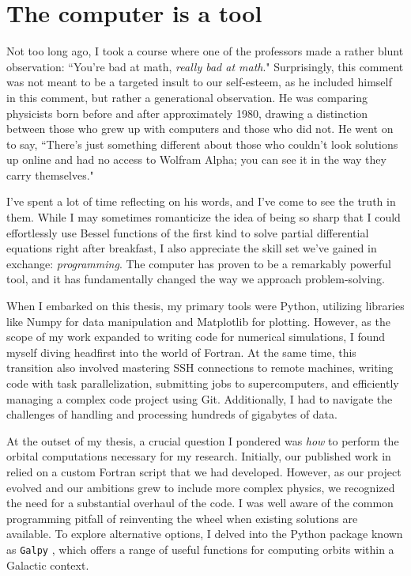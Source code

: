 \section{The computer is a tool} \label{sec:Computer}

Not too long ago, I took a course where one of the professors made a rather blunt observation: ``You're bad at math, \textit{really bad at math}." Surprisingly, this comment was not meant to be a targeted insult to our self-esteem, as he included himself in this comment, but rather a generational observation. He was comparing physicists born before and after approximately 1980, drawing a distinction between those who grew up with computers and those who did not. He went on to say, ``There's just something different about those who couldn't look solutions up online and had no access to Wolfram Alpha; you can see it in the way they carry themselves."

I've spent a lot of time reflecting on his words, and I've come to see the truth in them. While I may sometimes romanticize the idea of being so sharp that I could effortlessly use Bessel functions of the first kind to solve partial differential equations right after breakfast, I also appreciate the skill set we've gained in exchange: \textit{programming}. The computer has proven to be a remarkably powerful tool, and it has fundamentally changed the way we approach problem-solving.

When I embarked on this thesis, my primary tools were Python, utilizing libraries like Numpy for data manipulation and Matplotlib for plotting. However, as the scope of my work expanded to writing code for numerical simulations, I found myself diving headfirst into the world of Fortran. At the same time, this transition also involved mastering SSH connections to remote machines, writing code with task parallelization, submitting jobs to supercomputers, and efficiently managing a complex code project using Git. Additionally, I had to navigate the challenges of handling and processing hundreds of gigabytes of data.

At the outset of my thesis, a crucial question I pondered was \textit{how} to perform the orbital computations necessary for my research. Initially, our published work in \citet{2023A&A...673A..44F} relied on a custom Fortran script that we had developed. However, as our project evolved and our ambitions grew to include more complex physics, we recognized the need for a substantial overhaul of the code. I was well aware of the common programming pitfall of reinventing the wheel when existing solutions are available. To explore alternative options, I delved into the Python package known as \texttt{Galpy} \citep{2015ApJS..216...29B}, which offers a range of useful functions for computing orbits within a Galactic context.

